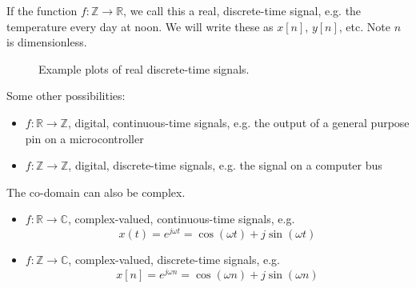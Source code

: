\begin{definition}
  If the function $f: \mathbb{Z} \rightarrow \mathbb{R}$, we call this a real, discrete-time signal, e.g. the temperature every day at noon. We will write these as $x[n]$, $y[n]$, etc. Note $n$ is dimensionless.
\end{definition}

\begin{figure}[ht]
  \begin{center}
  \end{center}
  \caption{Example plots of real discrete-time signals.}
  \label{fig:dtplots}
\end{figure}

Some other possibilities:
  
\begin{itemize}
\item $f: \mathbb{R} \rightarrow \mathbb{Z}$, digital, continuous-time signals, e.g. the output of a general purpose pin on a microcontroller
\item $f: \mathbb{Z} \rightarrow \mathbb{Z}$, digital, discrete-time signals, e.g. the signal on a computer bus
\end{itemize}

The co-domain can also be complex.

\begin{itemize}
\item $f: \mathbb{R} \rightarrow \mathbb{C}$, complex-valued, continuous-time signals, e.g.\\
  \[
  x(t) = e^{j\omega t} = \cos(\omega t) + j\sin(\omega t)
  \]
\item $f: \mathbb{Z} \rightarrow \mathbb{C}$, complex-valued, discrete-time signals, e.g.\\
  \[
  x[n] = e^{j\omega n} = \cos(\omega n) + j\sin(\omega n)
  \]
\end{itemize}
  
